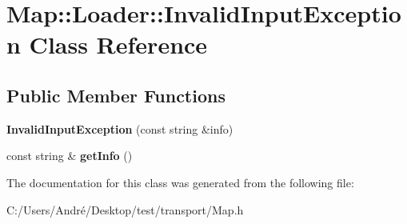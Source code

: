 \hypertarget{class_map_1_1_loader_1_1_invalid_input_exception}{}\section{Map\+:\+:Loader\+:\+:Invalid\+Input\+Exception Class Reference}
\label{class_map_1_1_loader_1_1_invalid_input_exception}
\subsection*{Public Member Functions}
\begin{DoxyCompactItemize}
\item 
\hypertarget{class_map_1_1_loader_1_1_invalid_input_exception_a23d2558846f42f211465f08c38191944}{}{\bfseries Invalid\+Input\+Exception} (const string \&info)\label{class_map_1_1_loader_1_1_invalid_input_exception_a23d2558846f42f211465f08c38191944}

\item 
\hypertarget{class_map_1_1_loader_1_1_invalid_input_exception_a73aacf27d8a4a1b071381ff00253f3a3}{}const string \& {\bfseries get\+Info} ()\label{class_map_1_1_loader_1_1_invalid_input_exception_a73aacf27d8a4a1b071381ff00253f3a3}

\end{DoxyCompactItemize}


The documentation for this class was generated from the following file\+:\begin{DoxyCompactItemize}
\item 
C\+:/\+Users/\+André/\+Desktop/test/transport/Map.\+h\end{DoxyCompactItemize}

